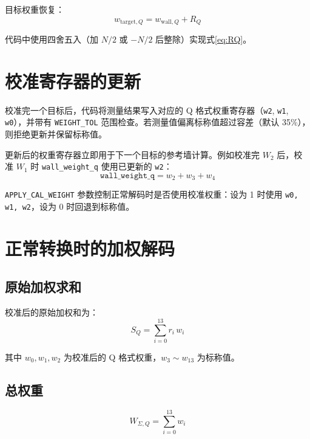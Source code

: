 \documentclass[
  UTF8,
  a4paper,
  11pt,
  oneside,
  fontset=fandol
]{ctexrep}
\newcommand{\code}[1]{\texttt{#1}}
\begin{document}
目标权重恢复：
\begin{equation}
\boxed{w_{\mathrm{target},Q} = w_{\mathrm{wall},Q} + R_Q}
\label{eq:WtargetQ}
\end{equation}

代码中使用四舍五入（加 $N/2$ 或 $-N/2$ 后整除）实现式\eqref{eq:RQ}。

\chapter{校准寄存器的更新}

校准完一个目标后，代码将测量结果写入对应的 Q 格式权重寄存器（\code{w2}, \code{w1}, \code{w0}），并带有 \code{WEIGHT\_TOL} 范围检查。若测量值偏离标称值超过容差（默认 35\%），则拒绝更新并保留标称值。

更新后的权重寄存器立即用于下一个目标的参考墙计算。例如校准完 $W_2$ 后，校准 $W_1$ 时 \code{wall\_weight\_q} 使用已更新的 \code{w2}：
\begin{equation}
\code{wall\_weight\_q} = w_2 + w_3 + w_4
\end{equation}

\code{APPLY\_CAL\_WEIGHT} 参数控制正常解码时是否使用校准权重：设为 1 时使用 \code{w0, w1, w2}，设为 0 时回退到标称值。

\chapter{正常转换时的加权解码}

\section{原始加权求和}

校准后的原始加权和为：
\begin{equation}
\boxed{S_Q = \sum_{i=0}^{13} r_i \, w_i}
\label{eq:SQ}
\end{equation}

其中 $w_0, w_1, w_2$ 为校准后的 Q 格式权重，$w_3 \sim w_{13}$ 为标称值。

\section{总权重}

\begin{equation}
\boxed{W_{\Sigma,Q} = \sum_{i=0}^{13} w_i}
\label{eq:WsumQ}
\end{equation}
\end{document}
